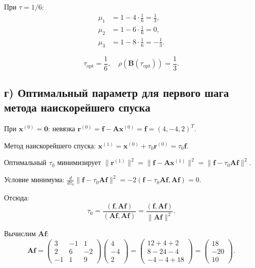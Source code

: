 \documentclass{article}
\begin{document}
При $\tau = 1/6$:
\begin{align}
\mu_1 &= 1 - 4 \cdot \frac{1}{6} = \frac{1}{3}, \\
\mu_2 &= 1 - 6 \cdot \frac{1}{6} = 0, \\
\mu_3 &= 1 - 8 \cdot \frac{1}{6} = -\frac{1}{3}.
\end{align}

\begin{equation}
\boxed{\tau_{\text{opt}} = \frac{1}{6}, \quad \rho(\mathbf{B}(\tau_{\text{opt}})) = \frac{1}{3}.}
\end{equation}

\subsection*{г) Оптимальный параметр для первого шага метода наискорейшего спуска}

При $\mathbf{x}^{(0)} = \mathbf{0}$: невязка $\mathbf{r}^{(0)} = \mathbf{f} - \mathbf{A}\mathbf{x}^{(0)} = \mathbf{f} = (4, -4, 2)^T$.

Метод наискорейшего спуска: $\mathbf{x}^{(1)} = \mathbf{x}^{(0)} + \tau_0 \mathbf{r}^{(0)} = \tau_0 \mathbf{f}$.

Оптимальный $\tau_0$ минимизирует $\|\mathbf{r}^{(1)}\|^2 = \|\mathbf{f} - \mathbf{A}\mathbf{x}^{(1)}\|^2 = \|\mathbf{f} - \tau_0 \mathbf{A}\mathbf{f}\|^2$.

Условие минимума: $\frac{d}{d\tau_0}\|\mathbf{f} - \tau_0 \mathbf{A}\mathbf{f}\|^2 = -2(\mathbf{f} - \tau_0 \mathbf{A}\mathbf{f}, \mathbf{A}\mathbf{f}) = 0$.

Отсюда:
\begin{equation}
\tau_0 = \frac{(\mathbf{f}, \mathbf{A}\mathbf{f})}{(\mathbf{A}\mathbf{f}, \mathbf{A}\mathbf{f})} = \frac{(\mathbf{f}, \mathbf{A}\mathbf{f})}{\|\mathbf{A}\mathbf{f}\|^2}.
\end{equation}

Вычислим $\mathbf{A}\mathbf{f}$:
\begin{equation}
\mathbf{A}\mathbf{f} = \begin{pmatrix} 3 & -1 & 1 \\ 2 & 6 & -2 \\ -1 & 1 & 9 \end{pmatrix} \begin{pmatrix} 4 \\ -4 \\ 2 \end{pmatrix} = \begin{pmatrix} 12 + 4 + 2 \\ 8 - 24 - 4 \\ -4 - 4 + 18 \end{pmatrix} = \begin{pmatrix} 18 \\ -20 \\ 10 \end{pmatrix}.
\end{equation}
\end{document}
